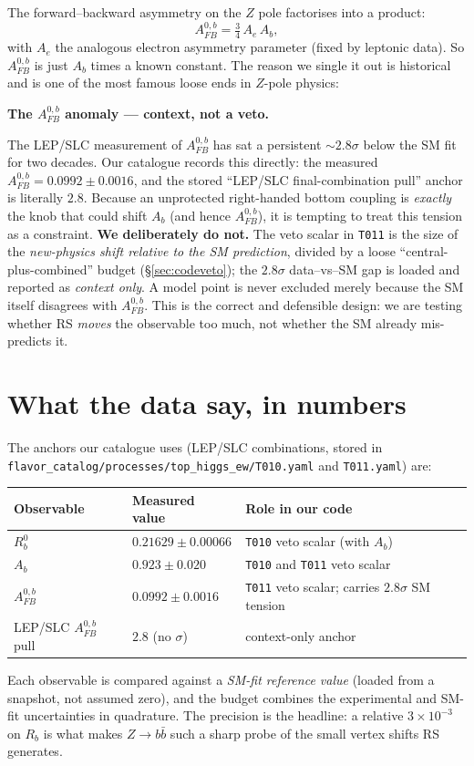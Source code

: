 \documentclass[11pt]{article}
\newenvironment{callout}[1]{%
  \par\medskip\begin{shaded}\noindent\textbf{#1}\par\smallskip}{\end{shaded}\medskip}
\newcommand{\code}[1]{\texttt{#1}}
\newcommand{\Afb}{A_{FB}^{0,b}}
\theoremstyle{definition}
\begin{document}
The forward--backward asymmetry on the $Z$ pole factorises into a product:
\begin{equation}
\Afb = \tfrac{3}{4}\,A_e\,A_b,
\label{eq:Afbdef}
\end{equation}
with $A_e$ the analogous electron asymmetry parameter (fixed by leptonic data).
So $\Afb$ is just $A_b$ times a known constant. The reason we single it out is
historical and is one of the most famous loose ends in $Z$-pole physics:

\begin{callout}{The $\Afb$ anomaly --- context, not a veto.}
The LEP/SLC measurement of $\Afb$ has sat a persistent $\sim 2.8\sigma$ below
the SM fit for two decades. Our catalogue records this directly: the measured
$\Afb = 0.0992 \pm 0.0016$, and the stored ``LEP/SLC final-combination pull''
anchor is literally $2.8$. Because an unprotected right-handed bottom coupling is
\emph{exactly} the knob that could shift $A_b$ (and hence $\Afb$), it is tempting
to treat this tension as a constraint. \textbf{We deliberately do not.} The
veto scalar in \code{T011} is the size of the \emph{new-physics shift relative to
the SM prediction}, divided by a loose ``central-plus-combined'' budget
(\S\ref{sec:codeveto}); the $2.8\sigma$ data--vs--SM gap is loaded and reported
as \emph{context only}. A model point is never excluded merely because the SM
itself disagrees with $\Afb$. This is the correct and defensible design: we are
testing whether RS \emph{moves} the observable too much, not whether the SM
already mis-predicts it.
\end{callout}

\section{What the data say, in numbers}
\label{sec:numbers}

The anchors our catalogue uses (LEP/SLC combinations, stored in
\code{flavor\_catalog/processes/top\_higgs\_ew/T010.yaml} and \code{T011.yaml})
are:
\begin{center}
\begin{tabular}{lll}
\toprule
Observable & Measured value & Role in our code \\
\midrule
$R_b^0$ & $0.21629 \pm 0.00066$ & \code{T010} veto scalar (with $A_b$) \\
$A_b$ & $0.923 \pm 0.020$ & \code{T010} and \code{T011} veto scalar \\
$\Afb$ & $0.0992 \pm 0.0016$ & \code{T011} veto scalar; carries $2.8\sigma$ SM tension \\
LEP/SLC $\Afb$ pull & $2.8$ (no $\sigma$) & context-only anchor \\
\bottomrule
\end{tabular}
\end{center}
Each observable is compared against a \emph{SM-fit reference value} (loaded from
a snapshot, not assumed zero), and the budget combines the experimental and
SM-fit uncertainties in quadrature. The precision is the headline: a relative
$3\times10^{-3}$ on $R_b$ is what makes $Z\to b\bar b$ such a sharp probe of the
small vertex shifts RS generates.
\end{document}
